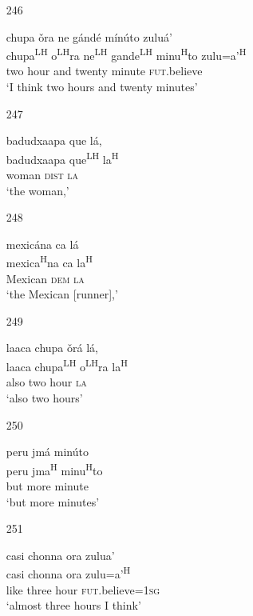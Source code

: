 \begin{itemize}
\item[246]
 
\glll   chupa \v{o}ra ne g\'{a}nd\'{e} m\'{i}n\'{u}to zulu\'{a}'\\
chupa\textsuperscript{LH} o\textsuperscript{LH}ra ne\textsuperscript{LH} gande\textsuperscript{LH} minu\textsuperscript{H}to zulu=a'\textsuperscript{H}\\
 two hour and twenty minute \textsc{fut}.believe\\
\glt `I think two hours and twenty minutes'
 


\item[247]
 
\glll   badudxaapa que l\'{a},\\
badudxaapa que\textsuperscript{LH} la\textsuperscript{H}\\
woman \textsc{dist} \textsc{la}\\
\glt `the woman,'
 


\item[248]
 
\glll   mexic\'{a}na ca l\'{a}\\
mexica\textsuperscript{H}na ca la\textsuperscript{H} \\
Mexican \textsc{dem} \textsc{la}\\
\glt `the Mexican [runner],' 
 


\item[249]
 
\glll   laaca chupa \v{o}r\'{a} l\'{a},\\
 laaca chupa\textsuperscript{LH} o\textsuperscript{LH}ra la\textsuperscript{H}\\
 also two hour \textsc{la}\\
\glt `also two hours'
 


\item[250]
 
\glll  peru jm\'{a} min\'{u}to\\
peru jma\textsuperscript{H} minu\textsuperscript{H}to\\
but more minute\\
\glt `but more minutes'
 


\item[251]
 
\glll  casi chonna ora zulua'\\
casi chonna ora zulu=a'\textsuperscript{H}\\
like three hour \textsc{fut}.believe=\textsc{1sg}\\
\glt `almost three hours I think'
 




\end{itemize}
